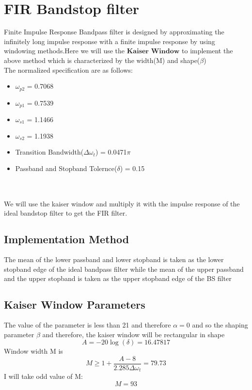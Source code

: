 \documentclass[12pt]{article}
\begin{document}
\section{FIR Bandstop filter}
Finite Impulse Response Bandpass filter is designed by approximating the infinitely long impulse response with a finite impulse response by using windowing methods.Here we will use the $\textbf{Kaiser Window}$ to implement the above method which is characterized by the width(M) and shape($\beta$)\\
The normalized specification are as follows:
\begin{itemize}
    \item 	 $\omega_{p2}$ = 0.7068
    \item    $\omega_{p1}$ = 0.7539
    \item    $\omega_{s1}$ = 1.1466
    \item    $\omega_{s2}$ = 1.1938
    \item    Transition Bandwidth($\Delta \omega_t$) = 0.0471$\pi$
    \item    Passband and Stopband Tolernce($\delta$) = 0.15

			
	
\end{itemize}
\\
\\
We will use the kaiser window and multiply it with the impulse response of the ideal bandstop filter to get the FIR filter.
\subsection{\textbf{Implementation Method}}
The mean of the lower passband and lower stopband is taken as the lower stopband edge of the ideal bandpass filter while the mean of the upper passband and the upper stopband is taken as the upper stopband edge of the BS filter
\subsection{\textbf{Kaiser Window Parameters}}
The value of the parameter is less than 21 and therefore $\alpha = 0$ and so the shaping parameter $\beta$ and therefore, the kaiser window will be rectangular in shape\\
\begin{equation*}
    A = -20\log(\delta) = 16.47817
\end{equation*}
Window width M is\\
\begin{equation*}
    M \geq 1+\frac{A-8}{2.285\Delta \omega_t} = 79.73
\end{equation*}
I will take odd value of M: \\
\begin{equation*}
    M = 93
\end{equation*}
\end{document}
